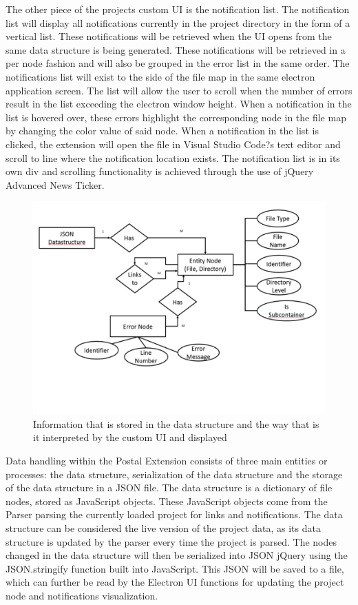 \documentclass[letterpaper,10pt,titlepage,draftclsnofoot,onecolumn,onesided] {IEEEtran}
\begin{document}
The other piece of the projects custom UI is the notification list. 
The notification list will display all notifications currently in the project directory in the form of a vertical list. 
These notifications will be retrieved when the UI opens from the same data structure is being generated. 
These notifications will be retrieved in a per node fashion and will also be grouped in the error list in the same order.
The notifications list will exist to the side of the file map in the same electron application screen. 
The list will allow the user to scroll when the number of errors result in the list exceeding the electron window height.
When a notification in the list is hovered over, these errors highlight the corresponding node in the file map by changing the color value of said node.
When a notification in the list is clicked, the extension will open the file in Visual Studio Code?s text editor and scroll to line where the notification location exists. 
The notification list is in its own div and scrolling functionality is achieved through the use of jQuery Advanced News Ticker. \\ %

\begin{figure}[H]
	\centering
	\includegraphics[width=.75\textwidth]{UpdatedDataStruct-eps-converted-to}
	\caption{Information that is stored in the data structure and the way that is it interpreted by the custom UI and displayed}
\end{figure}

Data handling within the Postal Extension consists of three main entities or processes: the data structure, serialization of the data structure and the storage of the data structure in a JSON file.
The data structure is a dictionary of file nodes, stored as JavaScript objects. 
These JavaScript objects come from the Parser parsing the currently loaded project for links and notifications.
The data structure can be considered the live version of the project data, as its data structure is updated by the parser every time the project is parsed. 
The nodes changed in the data structure will then be serialized into JSON jQuery using the JSON.stringify function built into JavaScript. 
This JSON will be saved to a file, which can further be read by the Electron UI functions for updating the project node and notifications visualization. \\
\end{document}
